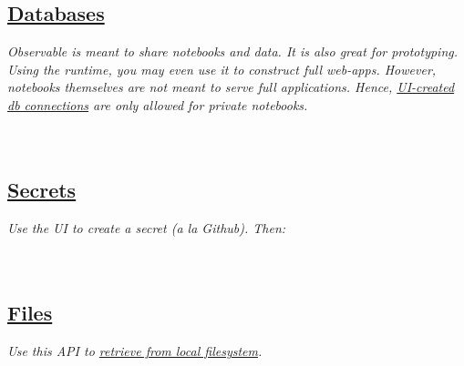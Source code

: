 \subsection*{\href{https://observablehq.com/@observablehq/databases}{Databases}}
\textit{Observable is meant to share notebooks and data. It is also great for prototyping. Using the runtime, you may even use it to construct full web-apps. However, notebooks themselves are not meant to serve full applications. Hence, \href{https://observablehq.com/@observablehq/databases}{UI-created db connections} are only allowed for private notebooks.}\\
\\
\\

\subsection*{\href{https://observablehq.com/@observablehq/secrets}{Secrets}}
\textit{Use the UI to create a secret (a la Github). Then:}\\
\\
\\


\subsection*{\href{https://github.com/observablehq/stdlib}{Files}}
\textit{Use this API to \href{https://observablehq.com/@mbostock/reading-local-files}{retrieve from local filesystem}.}\\
\\
\\
